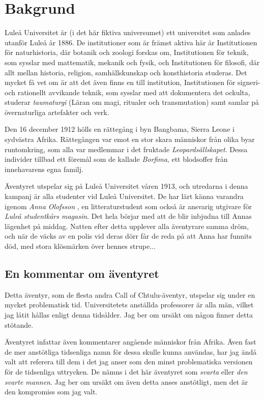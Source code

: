 \section{Bakgrund}
Luleå Universitet är (i det här fiktiva universumet) ett universitet som anlades utanför Luleå år 1886. De institutioner som är främst aktiva här är Institutionen för naturhistoria, där botanik och zoologi forskas om, Institutionen för teknik, som sysslar med mattematik, mekanik och fysik, och Institutionen för filosofi, där allt mellan historia, religion, samhällskunskap och konsthistoria studeras. Det mycket få vet om är att det även finns en till institution, Institutionen för signeri- och rationellt avvikande teknik, som sysslar med att dokumentera det ockulta, studerar \textit{taumaturgi} (Läran om magi, ritualer och transmutation) samt samlar på övernaturliga artefakter och verk.

Den 16 december 1912 hölls en rättegång i byn Bangbama, Sierra Leone i sydvästra Afrika. Rättegången var emot en stor skara människor från olika byar runtomkring, som alla var medlemmar i det fruktade \textit{Leopardsällskapet}. Dessa individer tillbad ett föremål som de kallade \textit{Borfima}, ett blodsoffer från innehavarens egna familj.

Äventyret utspelar sig på Luleå Universitet våren 1913, och utredarna i denna kampanj är alla studenter vid Luleå Universitet. De har lärt känna varandra igenom \textit{Anna Olofsson} \sectiondescribe{\ref{kar:AnnaOlofsson}}, en litteraturstudent som också är ansvarig utgivare för \textit{Luleå studentkårs magasin}. Det hela börjar med att de blir inbjudna till Annas lägenhet på middag. Natten efter detta upplever alla äventyrare samma dröm, och när de väcks av en polis vid deras dörr får de reda på att Anna har funnits död, med stora klösmärken över hennes strupe...

\subsection{En kommentar om äventyret}
Detta äventyr, som de flesta andra Call of Chtulu-äventyr, utspelar sig under en mycket problematisk tid. Universitetets anställda professorer är alla män, vilket jag låtit hållas enligt denna tidsålder. Jag ber om ursäkt om någon finner detta stötande.

Äventyret infattar även kommentarer angående människor från Afrika. Även fast de mer anstötliga tidsenliga namn för dessa skulle kunna användas, har jag ändå valt att referera till dem i det jag anser som den minst problematiska versionen för de tidsenliga uttrycken. De nämns i det här äventyret som \textit{svarta} eller \textit{den svarte mannen}. Jag ber om ursäkt om även detta anses anstötligt, men det är den kompromiss som jag valt.

